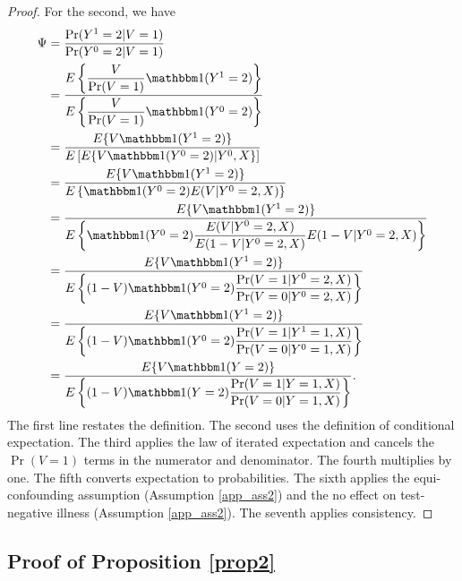 \begin{appendix}
\begin{refsection}
\begin{proof}
    For the second, we have 
    \begin{align*}
        \Psi &= \dfrac{\Pr(Y^1=2|V=1)}{\Pr(Y^0=2|V=1)} \\
        &= \dfrac{E\left\{\dfrac{V}{\Pr(V = 1)} \mathbbm 1 (Y^1 = 2)\right\}}{E\left\{\dfrac{V}{\Pr(V=1)}\mathbbm 1 (Y^0 = 2)\right\}} \\
        &= \dfrac{E\{V \mathbbm 1 (Y^1 = 2)\}}{E\left[ E\{V \mathbbm 1 (Y^0 = 2)| Y^0, X\}\right]} \\
        &= \dfrac{E\{V \mathbbm 1 (Y^1 = 2)\}}{E\left\{\mathbbm 1 (Y^0 = 2) E(V | Y^0 = 2, X)\right\}} \\
        &= \dfrac{E\{V \mathbbm 1 (Y^1 = 2)\}}{E\left\{\mathbbm 1 (Y^0 = 2) \dfrac{ E(V | Y^0 = 2, X)}{ E(1-V | Y^0 = 2, X)}E(1-V|Y^0 = 2, X)\right\}} \\
        &= \dfrac{E\{V \mathbbm 1 (Y^1 =2)\}}{E\left\{(1 - V)\mathbbm 1 (Y^0 = 2) \dfrac{ \Pr(V=1 | Y^0 = 2, X)}{ \Pr(V=0 | Y^0 = 2, X)}\right\}} \\
        &= \dfrac{E\{V \mathbbm 1 (Y^1 =2)\}}{E\left\{(1 - V)\mathbbm 1 (Y^0 = 2) \dfrac{ \Pr(V=1 | Y^1 = 1, X)}{ \Pr(V=0 | Y^0 = 1, X)}\right\}} \\
        &= \dfrac{E\{V \mathbbm 1 (Y =2)\}}{E\left\{(1 - V)\mathbbm 1 (Y = 2) \dfrac{ \Pr(V=1 | Y = 1, X)}{ \Pr(V=0 | Y = 1, X)}\right\}}.
    \end{align*}
    The first line restates the definition. The second uses the definition of conditional expectation. The third applies the law of iterated expectation and cancels the $\Pr(V=1)$ terms in the numerator and denominator. The fourth multiplies by one. The fifth converts expectation to probabilities. The sixth applies the equi-confounding assumption (Assumption \ref{app_ass2}) and the no effect on test-negative illness (Assumption \ref{app_ass2}). The seventh applies consistency. 
     
    \end{proof}
    \newpage

    \subsection{Proof of Proposition \ref{prop2}}\label{sec:proof2}
    

\end{refsection}
\end{appendix}
